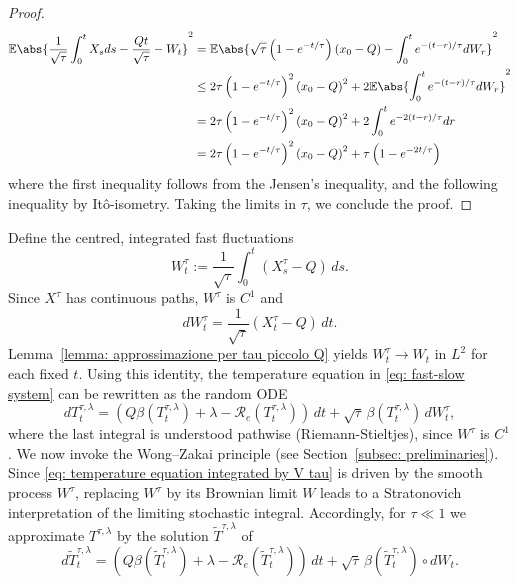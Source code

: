 \documentclass[10pt]{amsart}
\numberwithin{equation}{section}
\begin{document}
\begin{proof}
    \begin{equation*}
        \begin{split}
             \mathbb{E} \abs{\frac{1}{\sqrt{\tau}} \int_0^t X_s ds - \frac{Qt}{\sqrt{\tau}} - W_t }^2 &= \mathbb{E} \abs{\sqrt{\tau} \left(1 - e^{-t/\tau} \right) \left(x_0 - Q\right) - \int_0^t e^{-(t-r)/\tau} dW_r }^2 \\
             & \leq 2\tau \left(1 - e^{-t/\tau} \right)^2 \left(x_0 - Q\right)^2 + 2 \mathbb{E} \abs{\int_0^t e^{-(t-r)/\tau} dW_r}^2 \\
             &= 2\tau \left(1 - e^{-t/\tau} \right)^2 \left(x_0 - Q\right)^2 + 2   \int_0^t e^{-2(t-r)/\tau} dr \\
             & = 2\tau \left(1 - e^{-t/\tau} \right)^2 \left(x_0 - Q\right)^2 +  \tau \left( 1- e^{-2t/\tau} \right)
        \end{split}
    \end{equation*}
    where the first inequality follows from the Jensen's inequality, and the following inequality by It\^{o}-isometry. Taking the limits in $\tau$, we conclude the proof.
    
\end{proof}
Define the centred, integrated fast fluctuations
$$
W_t^\tau := \frac{1}{\sqrt{\tau}}\int_0^t (X_s^\tau-Q)\,ds .
$$
Since $X^\tau$ has continuous paths, $W^\tau$ is $C^1$ and
$$
dW_t^\tau = \frac{1}{\sqrt{\tau}}(X_t^\tau-Q)\,dt .
$$
Lemma~\ref{lemma: approssimazione per tau piccolo Q} yields $W_t^\tau \to W_t$ in $L^2$ for each fixed $t$.
Using this identity, the temperature equation in \eqref{eq: fast-slow system} can be rewritten as the random ODE
\begin{equation}
dT_t ^{\tau,\lambda} =
\left(Q\beta(T_t^{\tau,\lambda})+\lambda-\mathcal{R}_e(T^{\tau,\lambda} _t)\right)\,dt
+\sqrt{\tau}\,\beta(T_t^{\tau,\lambda})\,dW_t^\tau ,
\label{eq: temperature equation integrated by V tau}
\end{equation}
where the last integral is understood pathwise (Riemann-Stieltjes), since $W^\tau$ is $C^1$. We now invoke the Wong--Zakai principle (see Section~\ref{subsec: preliminaries}).
Since \eqref{eq: temperature equation integrated by V tau} is driven by the smooth process $W^\tau$, replacing $W^\tau$
by its Brownian limit $W$ leads to a Stratonovich interpretation of the limiting stochastic integral.
Accordingly, for $\tau\ll 1$ we approximate $T^{\tau,\lambda}$ by the solution $\widetilde T ^{\tau,\lambda}$ of
\begin{equation}
\label{eq: Stratonovich EBM sec 1}
d \widetilde{T}_t ^{\tau,\lambda}
= \left(Q\beta(\widetilde{T}_t ^{\tau,\lambda})+\lambda-\mathcal{R}_e(\widetilde T_t ^{\tau,\lambda})\right)\,dt
+ \sqrt{\tau}\,\beta(\widetilde{T}_t ^{\tau,\lambda})\circ dW_t.
\end{equation}
\end{document}
